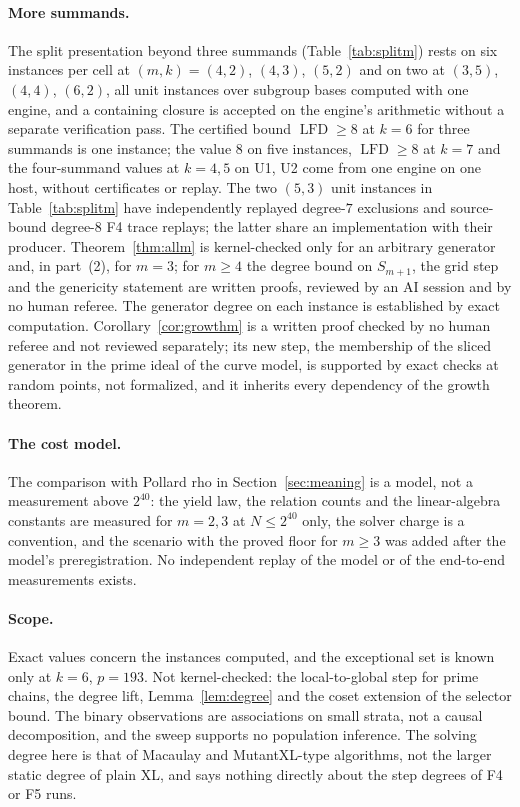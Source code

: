 \documentclass[11pt]{article}
\theoremstyle{definition}\newtheorem{definition}[theorem]{Definition}
\theoremstyle{remark}\newtheorem{remark}[theorem]{Remark}
\newcommand{\lfd}{\operatorname{LFD}}
\begin{document}
\paragraph{More summands.} The split presentation beyond three summands
(Table~\ref{tab:splitm}) rests on six instances per cell at
$(m,k)=(4,2)$, $(4,3)$, $(5,2)$ and on two at $(3,5)$, $(4,4)$, $(6,2)$,
all unit instances over subgroup bases computed with one engine, and a
containing closure is accepted on the engine's arithmetic without a separate
verification pass. The certified bound $\lfd\ge8$ at $k=6$ for three
summands is one instance; the value $8$ on five instances, $\lfd\ge8$ at
$k=7$ and the four-summand values at $k=4,5$ on U1, U2 come from one engine
on one host, without certificates or replay.
The two $(5,3)$ unit instances in Table~\ref{tab:splitm} have independently
replayed degree-$7$ exclusions and source-bound degree-$8$ F4 trace replays;
the latter share an implementation with their producer.
Theorem~\ref{thm:allm} is
kernel-checked only for an arbitrary generator and, in part~(2), for $m=3$;
for $m\ge4$ the degree bound on $S_{m+1}$, the grid step and the genericity
statement are written proofs, reviewed by an AI session and by no human
referee. The generator degree on each instance is established by exact
computation. Corollary~\ref{cor:growthm} is a written proof checked by no
human referee and not reviewed separately; its new step, the membership of
the sliced generator in the prime ideal of the curve model, is supported by
exact checks at random points, not formalized, and it inherits every
dependency of the growth theorem.

\paragraph{The cost model.} The comparison with Pollard rho in
Section~\ref{sec:meaning} is a model, not a measurement above $2^{40}$: the
yield law, the relation counts and the linear-algebra constants are measured
for $m=2,3$ at $N\le2^{40}$ only, the solver charge is a convention, and
the scenario with the proved floor for $m\ge3$ was added after the model's
preregistration. No independent replay of the model or of the end-to-end
measurements exists.

\paragraph{Scope.} Exact values concern the instances computed, and the
exceptional set is known only at $k=6$, $p=193$. Not kernel-checked: the
local-to-global step for prime chains, the degree lift,
Lemma~\ref{lem:degree} and the coset extension of the selector bound. The
binary observations are associations on small strata, not a causal
decomposition, and the sweep supports no population inference. The
solving degree here is that of Macaulay and MutantXL-type algorithms, not
the larger static degree of plain XL, and says nothing directly about the
step degrees of F4 or F5 runs.
\end{document}
